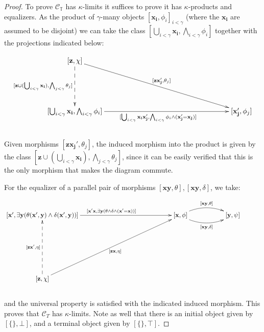\documentclass[a4paper,11pt]{article}
\theoremstyle{plain}
\theoremstyle{plain}
\theoremstyle{remark}
\newcommand{\theory}{\ensuremath{\mathbb{T}}}
\begin{document}
\begin{proof} To prove $\mathcal{C}_{\theory}$ has $\kappa$-limits it suffices to prove it has $\kappa$-products and equalizers. As the product of $\gamma$-many objects $[\mathbf{x_i}, \phi_i]_{i<\gamma}$ (where the $\mathbf{x_i}$ are assumed to be disjoint) we can take the class $[\bigcup_{i<\gamma}\mathbf{x_i}, \bigwedge_{i<\gamma} \phi_i]$ together with the projections indicated below:

\begin{displaymath}
\xymatrix{
 [\mathbf{z}, \chi] \ar@{-->}[dd]_{[\mathbf{z} \cup (\bigcup_{i<\gamma}\mathbf{x_i}), \bigwedge_{j<\gamma} \theta_j]} \ar@{->}[ddrrrrrr]^{[\mathbf{z}\mathbf{x_j'}, \theta_j]} & & & & & &\\
& & & & & & \\
 [\bigcup_{i<\gamma}\mathbf{x_i}, \bigwedge_{i<\gamma} \phi_i] \ar@{->}[rrrrrr]_{[\bigcup_{i<\gamma}\mathbf{x_i}\mathbf{x_j'}, \bigwedge_{i<\gamma} \phi_i \wedge (\mathbf{x_j'}=\mathbf{x_j})]} & & & & & & [\mathbf{x_j'}, \phi_j]\\
}
\end{displaymath}
\\
Given morphisms $[\mathbf{z}\mathbf{x_j'}, \theta_j]$, the induced morphism into the product is given by the class $[\mathbf{z}\cup (\bigcup_{i<\gamma}\mathbf{x_i}), \bigwedge_{j<\gamma} \theta_j]$, since it can be easily verified that this is the only morphism that makes the diagram commute.

For the equalizer of a parallel pair of morphisms $[\mathbf{x}\mathbf{y}, \theta], [\mathbf{x}\mathbf{y}, \delta]$, we take:

\begin{displaymath}
\xymatrix{
[\mathbf{x'}, \exists \mathbf{y} (\theta(\mathbf{x'}, \mathbf{y}) \wedge \delta(\mathbf{x'}, \mathbf{y}))] \ar@{->}[rrrrr]^{[\mathbf{x'}\mathbf{x}, \exists \mathbf{y} (\theta \wedge \delta \wedge (\mathbf{x'}=\mathbf{x}))]} & & & & & [\mathbf{x}, \phi] \ar@/^{1pc}/[rr]^{[\mathbf{x}\mathbf{y}, \theta]} \ar@/_{1pc}/[rr]_{[\mathbf{x}\mathbf{y}, \delta]} & & [\mathbf{y}, \psi]\\
 & & & & & & & & \\
 & & & & & & & & \\
[\mathbf{z}, \chi] \ar@{->}[uuurrrrr]_{[\mathbf{z}\mathbf{x}, \eta]} \ar@{-->}[uuu]^{[\mathbf{z}\mathbf{x'}, \eta]} & & & & & & & & \\
}
\end{displaymath}
\\
and the universal property is satisfied with the indicated induced morphism. This proves that $\mathcal{C}_T$ has $\kappa$-limits. Note as well that there is an initial object given by $[\{\}, \bot]$, and a terminal object given by $[\{\}, \top]$.


\end{proof}
\end{document}

